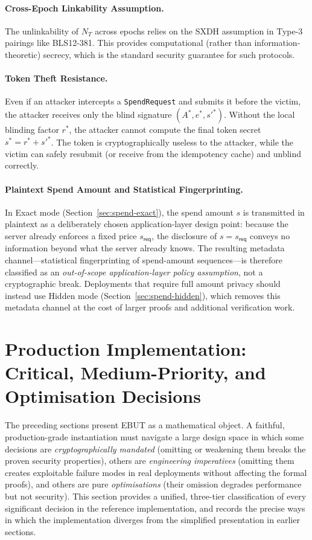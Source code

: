 \documentclass[11pt]{article}
\theoremstyle{definitionstyle}
\theoremstyle{plain}
\begin{document}
\paragraph{Cross-Epoch Linkability Assumption.}
The unlinkability of $N_T$ across epochs relies on the SXDH assumption in Type-3 pairings like BLS12-381. This provides computational (rather than information-theoretic) secrecy, which is the standard security guarantee for such protocols.

\paragraph{Token Theft Resistance.}
Even if an attacker intercepts a \texttt{SpendRequest} and submits it before the victim, the attacker receives only the blind signature $(A^*, e^*, s'^*)$. Without the local blinding factor $r^*$, the attacker cannot compute the final token secret $s^* = r^* + s'^*$. The token is cryptographically useless to the attacker, while the victim can safely resubmit (or receive from the idempotency cache) and unblind correctly.

\paragraph{Plaintext Spend Amount and Statistical Fingerprinting.}
In Exact mode (Section~\ref{sec:spend-exact}), the spend amount $s$ is transmitted in plaintext as a deliberately chosen application-layer design point: because the server already enforces a fixed price $s_{\mathsf{req}}$, the disclosure of $s = s_{\mathsf{req}}$ conveys no information beyond what the server already knows.  The resulting metadata channel—statistical fingerprinting of spend-amount sequences—is therefore classified as an \emph{out-of-scope application-layer policy assumption}, not a cryptographic break.  Deployments that require full amount privacy should instead use Hidden mode (Section~\ref{sec:spend-hidden}), which removes this metadata channel at the cost of larger proofs and additional verification work.

\section{Production Implementation: Critical, Medium-Priority, and Optimisation Decisions}
\label{sec:implementation-triage}
\label{sec:implementation}

The preceding sections present EBUT as a mathematical object.  A faithful,
production-grade instantiation must navigate a large design space in which
some decisions are \emph{cryptographically mandated} (omitting or weakening
them breaks the proven security properties), others are \emph{engineering
imperatives} (omitting them creates exploitable failure modes in real
deployments without affecting the formal proofs), and others are pure
\emph{optimisations} (their omission degrades performance but not security).
This section provides a unified, three-tier classification of every
significant decision in the reference implementation, and records the
precise ways in which the implementation diverges from the simplified
presentation in earlier sections.
\end{document}
